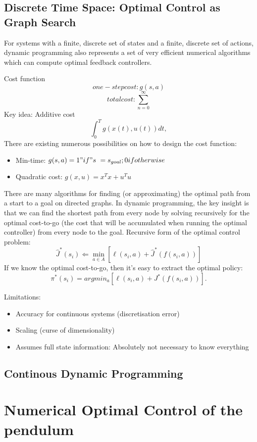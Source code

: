 \subsection{Discrete Time Space: Optimal Control as Graph Search}
For systems with a finite, discrete set of states and a finite, discrete set of actions, dynamic programming also represents a set of very efficient numerical algorithms which can compute optimal feedback controllers.

Cost function
$$one-step cost: g(s,a)$$
$$total cost: \sum_{n=0}^{\infty} $$
Key idea: Additive cost 
$$\int_0^T g(x(t),u(t)) dt,$$
There are existing numerous possibilities on how to design the cost function:
\begin{itemize}
\item Min-time: $g(s,a) = 1 "if" s~=s_{goal}; 0 if otherwise$
\item Quadratic cost: $g(x,u)=x^{T}x+u^{T}u$
\end{itemize}
There are many algorithms for finding (or approximating) the optimal path from a start to a goal on directed graphs. In dynamic programming, the key insight is that we can find the shortest path from every node by solving recursively for the optimal cost-to-go (the cost that will be accumulated when running the optimal controller) from every node to the goal.
Recursive form of the optimal control problem:
\begin{equation} \hat{J}^*(s_i) \Leftarrow \min_{a \in A} \left[ \ell(s_i,a) +
    \hat{J}^*\left({f(s_i,a)}\right) \right]
    \end{equation}
If we know the optimal cost-to-go, then it's easy to extract the optimal policy:
\begin{equation} \pi^{*}(s_i) = argmin_a
    \left[ \ell(s_i,a) + J^*\left( f(s_i,a) \right) \right].
\end{equation}

Limitations:
\begin{itemize}
\item Accuracy for continuous systems (discretisation error)
\item Scaling (curse of dimensionality)
\item Assumes full state information: Absolutely not necessary to know everything
\end{itemize}

\subsection{Continous Dynamic Programming}






\section{Numerical Optimal Control of the pendulum}
